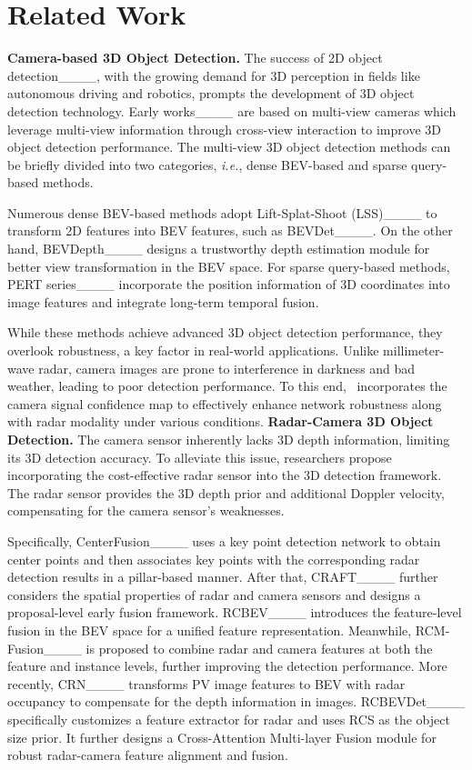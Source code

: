 \section{Related Work}
\label{sec:related_work}
%
{\flushleft \textbf{Camera-based 3D Object Detection.}}  
The success of 2D object detection____, with the growing demand for 3D perception in fields like autonomous driving and robotics, prompts the development of 3D object detection technology. 
Early works____ are based on multi-view cameras which leverage multi-view information through cross-view interaction to improve 3D object detection performance. 
%
The multi-view 3D object detection methods can be briefly divided into two categories, \textit{i.e.}, dense BEV-based and sparse query-based methods. 

Numerous dense BEV-based methods adopt Lift-Splat-Shoot (LSS)____ to transform 2D features into BEV features, such as BEVDet____. 
%
On the other hand, BEVDepth____ designs a trustworthy depth estimation module for better view transformation in the BEV space. 
%
For sparse query-based methods, 
%
PERT series____ incorporate the position information of 3D coordinates into image features and integrate long-term temporal fusion.


While these methods achieve advanced 3D object detection performance, they overlook robustness, a key factor in real-world applications. Unlike millimeter-wave radar, camera images are prone to interference in darkness and bad weather, leading to poor detection performance.
%
To this end, \modelname~incorporates the camera signal confidence map to effectively enhance network robustness along with radar modality under various conditions.
{\flushleft \textbf{Radar-Camera 3D Object Detection.}}  
The camera sensor inherently lacks 3D depth information, limiting its 3D detection accuracy. 
%
To alleviate this issue, researchers propose incorporating the cost-effective radar sensor into the 3D detection framework.
%
The radar sensor provides the 3D depth prior and additional Doppler velocity, compensating for the camera sensor's weaknesses. 

Specifically, CenterFusion____ uses a key point detection network to obtain center points and then associates key points with the corresponding radar detection results in a pillar-based manner. 
%
After that, CRAFT____ further considers the spatial properties of radar and camera sensors and designs a proposal-level early fusion framework.
%
RCBEV____ introduces the feature-level fusion in the BEV space for a unified feature representation. 
%
Meanwhile, RCM-Fusion____ is proposed to combine radar and camera features at both the feature and instance levels, further improving the detection performance. 
%
More recently, CRN____ transforms PV image features to BEV with radar occupancy to compensate for the depth information in images. 
%
RCBEVDet____ specifically customizes a feature extractor for radar and uses RCS as the object size prior. 
%
It further designs a Cross-Attention Multi-layer Fusion module for robust radar-camera feature alignment and fusion.

